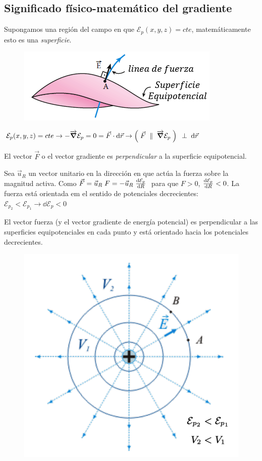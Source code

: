 \subsection{Significado físico-matemático del gradiente}
\label{potenciales-decrecientes}
\begin{multicols}{2}
Supongamos una región del campo en que $\mathcal E_p(x,y,z)=cte$, matemáticamente esto es una \emph{superficie}.
\begin{figure}[H]
		\centering
		\includegraphics[width=.5\textwidth]{imagenes/imagenes03/T03IM14.png}
		\end{figure}
\end{multicols}

$\mathcal E_p(x,y,z)=cte \to - \overrightarrow{\grad} \mathcal E_p = 0 = \vec F \cdot \dd \vec r \to \left( \; \vec F \;\parallel \; \overrightarrow{\grad}  \mathcal E_p \; \right) \; \; \bot \; \; \dd \vec r$

El vector $\vec F$ o el vector gradiente es \emph{perpendicular} a la superficie equipotencial.

Sea $\vec u_R$ un vector unitario en la dirección en que actúa la fuerza sobre la magnitud activa. Como
$\vec F = \vec u_R \; F=- \vec u_R \; \dv{\mathcal E_p}{R}\;$
para que $F>0$, $\dv{\mathcal E_p}{R} <0$. La fuerza está orientada em el sentido de potenciales decrecientes: $\mathcal E_{p_2} < \mathcal E_{p_1} \to \dd \mathcal E_p < 0$

El vector fuerza (y el vector gradiente de energía potencial) es perpendicular a las superficies equipotenciales en cada punto y está orientado hacia los potenciales decrecientes.
\vspace{-5mm}\begin{figure}[H]
		\centering
		\includegraphics[width=.4\textwidth]{imagenes/imagenes03/T03IM15.png}
		\end{figure}


